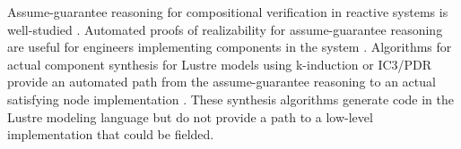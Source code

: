Assume-guarantee reasoning for compositional verification in reactive systems is well-studied \cite{10.1007/978-3-642-28891-3_13, composition1, 10.1145/2658982.2527272, 10.1007/978-3-319-17524-9_7}. Automated proofs of realizability for assume-guarantee reasoning are useful for engineers implementing components in the system \cite{10.1007/978-3-319-17524-9_13, 10.1007/978-3-319-29613-5_7}. Algorithms for actual component synthesis for Lustre models using k-induction or IC3/PDR provide an automated path from the assume-guarantee reasoning to an actual satisfying node implementation \cite{katis2017synthesis, 10.1007/978-3-319-89963-3_10}. These synthesis algorithms generate code in the Lustre modeling language but do not provide a path to a low-level implementation that could be fielded.
